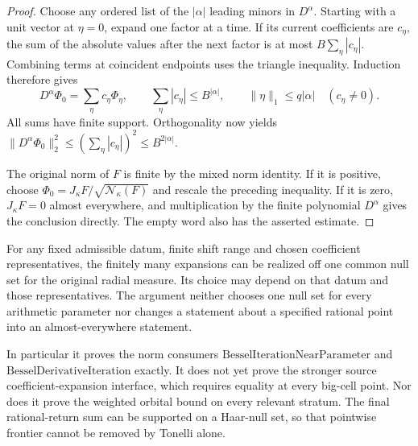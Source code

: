 \begin{proof}
Choose any ordered list of the $|\alpha|$ leading minors in
$D^\alpha$. Starting with a unit vector at $\eta=0$, expand
one factor at a time. If its current coefficients are $c_\eta$,
the sum of the absolute values after the next factor is at most
$B\sum_\eta|c_\eta|$. Combining terms at coincident endpoints
uses the triangle inequality. Induction therefore gives
\[
 D^\alpha\Phi_0=\sum_\eta c_\eta\Phi_\eta,\qquad
 \sum_\eta|c_\eta|\le B^{|\alpha|},\qquad
 \|\eta\|_1\le q|\alpha|\quad(c_\eta\ne0).
\]
All sums have finite support. Orthogonality now yields
$\|D^\alpha\Phi_0\|_2^2
\le(\sum_\eta|c_\eta|)^2\le B^{2|\alpha|}$.

The original norm of $F$ is finite by the mixed norm identity.
If it is positive, choose
$\Phi_0=J_\kappa F/\sqrt{\mathcal N_\kappa(F)}$ and rescale
the preceding inequality. If it is zero, $J_\kappa F=0$
almost everywhere, and multiplication by the finite polynomial
$D^\alpha$ gives the conclusion directly. The empty word also
has the asserted estimate.
\end{proof}

For any fixed admissible datum, finite shift range and chosen
coefficient representatives, the finitely many expansions can be
realized off one common null set for the original radial measure.
Its choice may depend on that datum and those representatives.
The argument neither chooses one null set for every arithmetic
parameter nor changes a statement about a specified rational point
into an almost-everywhere statement.

In particular it proves the norm consumers
$\mathrm{BesselIterationNearParameter}$ and
$\mathrm{BesselDerivativeIteration}$ exactly.
It does not yet prove the stronger source coefficient-expansion
interface, which requires equality at every big-cell point.
Nor does it prove the weighted orbital bound on every relevant
stratum. The final rational-return sum can be supported on a
Haar-null set, so that pointwise frontier cannot be removed
by Tonelli alone.
